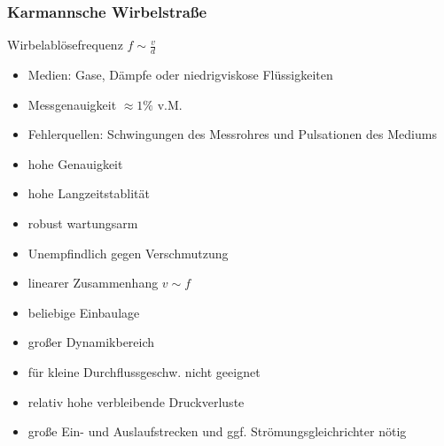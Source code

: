 \documentclass[a4paper]{scrartcl}
\begin{document}
\subsubsection{Karmannsche Wirbelstraße}
Wirbelablösefrequenz $f \sim \frac{v}{d}$
\begin{itemize}
\item Medien: Gase, Dämpfe oder niedrigviskose Flüssigkeiten
\item Messgenauigkeit $\approx 1 \% $ v.M.
\item Fehlerquellen: Schwingungen des Messrohres und Pulsationen des Mediums
\item hohe Genauigkeit
\item hohe Langzeitstablität
\item robust wartungsarm
\item Unempfindlich gegen Verschmutzung
\item linearer Zusammenhang $v \sim f$
\item beliebige Einbaulage
\item großer Dynamikbereich
\item für kleine Durchflussgeschw. nicht geeignet
\item relativ hohe verbleibende Druckverluste
\item große Ein- und Auslaufstrecken und ggf. Strömungsgleichrichter nötig
\end{itemize}
\end{document}
